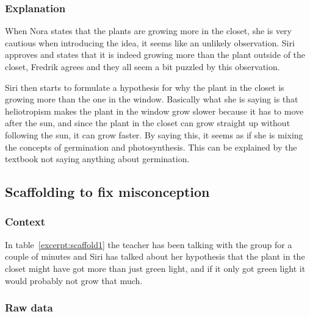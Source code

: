 \subsubsection*{Explanation}
When Nora states that the plants are growing more in the closet, she is very cautious when introducing the idea, it seems like an unlikely observation. Siri approves and states that it is indeed growing more than the plant outside of the closet, Fredrik agrees and they all seem a bit puzzled by this observation.

Siri then starts to formulate a hypothesis for why the plant in the closet is growing more than the one in the window. Basically what she is saying is that heliotropism makes the plant in the window grow slower because it has to move after the sun, and since the plant in the closet can grow straight up without following the sun, it can grow faster. By saying this, it seems as if she is mixing the concepts of germination and photosynthesis.%
This can be explained by the textbook not saying anything about germination. 

\subsection{Scaffolding to fix misconception}

\subsubsection*{Context}
In table~\ref{excerpt:scaffold1} the teacher has been talking with the group for a couple of minutes and Siri has talked about her hypothesis that the plant in the closet might have got more than just green light, and if it only got green light it would probably not grow that much.
 
\subsubsection*{Raw data}

